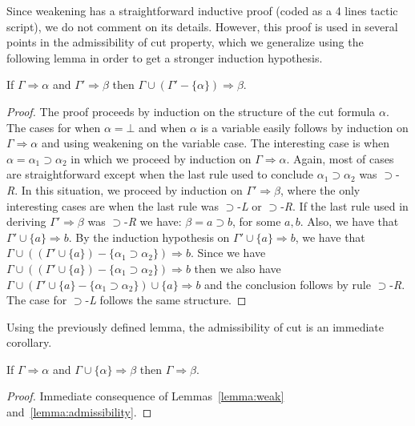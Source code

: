 Since weakening has a straightforward inductive proof (coded as a 4 lines tactic script),
we do not comment on its details. However, this proof is used in several points in the admissibility
of cut property, which we generalize using the following lemma in order to get a stronger
induction hypothesis.



\begin{Lemma}\label{lemma:admissibility}
   If $\Gamma\Rightarrow\alpha$ and $\Gamma'\Rightarrow \beta$ then $\Gamma \cup (\Gamma' - \{\alpha\}) \Rightarrow \beta$.
\end{Lemma}
\begin{proof}
   The proof proceeds by induction on the structure of the cut formula $\alpha$. The cases for when $\alpha = \bot$ and
   when $\alpha$ is a variable easily follows by induction on  $\Gamma\Rightarrow\alpha$ and using weakening on the variable case.
   The interesting case is when $\alpha = \alpha_1 \supset \alpha_2$ in which we proceed by induction on $\Gamma\Rightarrow\alpha$.
   Again, most of cases are straightforward except when the last rule used to conclude $\alpha_1\supset\alpha_2$ was $\supset$-\textit{R}.
   In this situation, we proceed by induction on $\Gamma'\Rightarrow \beta$, where the only interesting cases are when the last rule was
   $\supset$-\textit{L} or $\supset$-\textit{R}. If the last rule used in deriving $\Gamma' \Rightarrow \beta$ was
   $\supset$-\textit{R} we have: $\beta = a \supset b$, for some $a,b$.
   Also, we have that $\Gamma' \cup \{a\}\Rightarrow b$. By the
   induction hypothesis on $\Gamma' \cup \{a\}\Rightarrow b$, we
   have that $\Gamma \cup ((\Gamma' \cup \{a\}) - \{\alpha_1 \supset \alpha_2\})\Rightarrow b$. Since we have 
   $\Gamma \cup ((\Gamma' \cup \{a\}) - \{\alpha_1 \supset \alpha_2\})\Rightarrow b$ then we also have
   $\Gamma \cup (\Gamma' \cup \{a\} - \{\alpha_1 \supset \alpha_2\}) \cup \{a\} \Rightarrow b$ and the conclusion follows by rule
   $\supset$-\textit{R}. The case for $\supset$-\textit{L} follows the same structure.
\end{proof}

Using the previously defined lemma, the admissibility of cut is an immediate corollary.



\begin{Corollary}
  If $\Gamma \Rightarrow \alpha$ and $\Gamma \cup\{\alpha\}\Rightarrow \beta$
  then $\Gamma \Rightarrow \beta$.
\end{Corollary}
\begin{proof}
  Immediate consequence of Lemmas~\ref{lemma:weak} and~\ref{lemma:admissibility}.
\end{proof}



